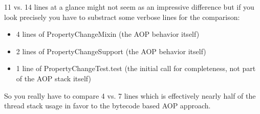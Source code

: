11 vs. 14 lines at a glance might not seem as an impressive difference but if you look precisely you have to substract some verbose lines for the comparison: 
\begin{itemize}
	\item 4 lines of PropertyChangeMixin (the AOP behavior itself)
	\item 2 lines of PropertyChangeSupport (the AOP behavior itself)
	\item 1 line of PropertyChangeTest.test (the initial call for completeness, not part of the AOP stack itself)
\end{itemize}
So you really have to compare 4 vs. 7 lines which is effectively nearly half of the thread stack usage in favor to the bytecode based AOP approach.

